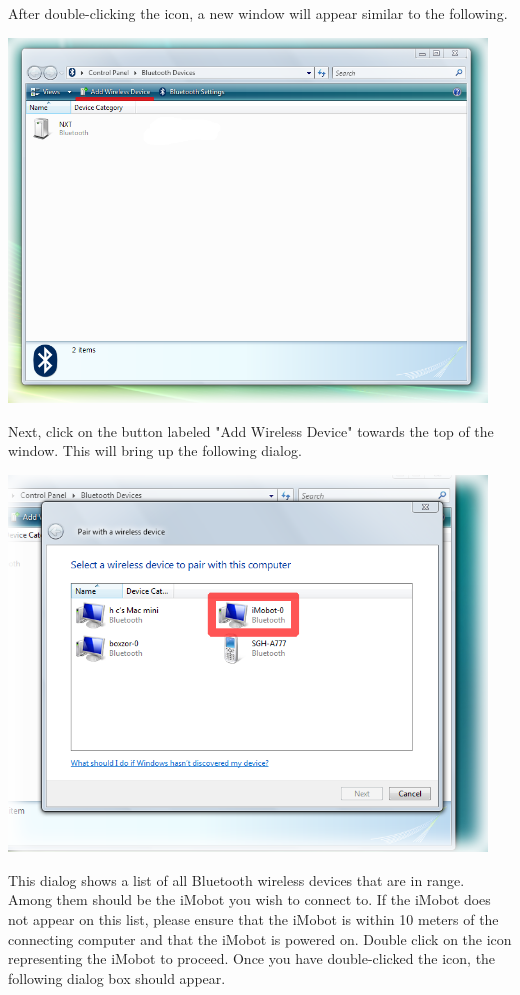 \documentclass{article}
\begin{document}
After double-clicking the icon, a new window will appear similar to the following.

\begin{center}
\includegraphics[width=5in]{images/imobot_connect_1a.png}
\end{center}

Next, click on the
button labeled "Add Wireless Device" towards the top of the window. This 
will bring up the following dialog.

\begin{center}
\includegraphics[width=5in]{images/imobot_connect_2.png}
\end{center}

This dialog shows a list of all Bluetooth wireless devices that are in range.
Among them should be the iMobot you wish to connect to. If the iMobot does not
appear on this list, please ensure that the iMobot is within 10 meters of the
connecting computer and that the iMobot is powered on. Double click on the icon
representing the iMobot to proceed. Once you have double-clicked the icon, the
following dialog box should appear.
\end{document}
